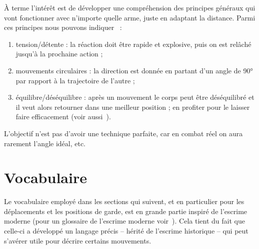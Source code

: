 À terme l'intérêt est de développer une compréhension des principes généraux qui vont fonctionner avec n'importe quelle arme, juste en adaptant la distance.
Parmi ces principes nous pouvons indiquer~\cite{enzi:dijon:messer_inner:2015} :
\begin{enumerate}
	\item tension/détente : la réaction doit être rapide et explosive, puis on est relâché jusqu'à la prochaine action ;
	\item mouvements circulaires : la direction est donnée en partant d'un angle de 90° par rapport à la trajectoire de l'autre ;
	\item équilibre/déséquilibre : après un mouvement le corps peut être déséquilibré et il veut alors retourner dans une meilleur position ; en profiter pour le laisser faire efficacement (voir aussi~\cite{guidoux:dijon:thibault:2015}).
\end{enumerate}
L'objectif n'est pas d'avoir une technique parfaite, car en combat réel on aura rarement l'angle idéal, etc.


\section{Vocabulaire}


Le vocabulaire employé dans les sections qui suivent, et en particulier pour les déplacements et les positions de garde, est en grande partie inspiré de l'escrime moderne (pour un glossaire de l'escrime moderne voir~\cite{FIE:2014:BrefsGlossairesLescrime}).
Cela tient du fait que celle-ci a développé un langage précis -- hérité de l'escrime historique -- qui peut s'avérer utile pour décrire certains mouvements.
